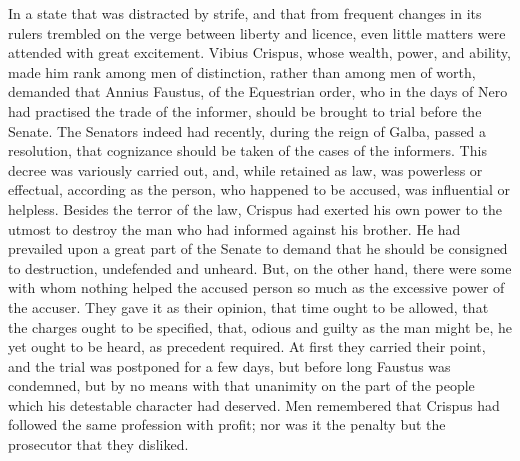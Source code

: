 In a state that was distracted by strife, and that from frequent changes in its rulers trembled on the verge between liberty and licence, even little matters were attended with great excitement. Vibius Crispus, whose wealth, power, and ability, made him rank among men of distinction, rather than among men of worth, demanded that Annius Faustus, of the Equestrian order, who in the days of Nero had practised the trade of the informer, should be brought to trial before the Senate. The Senators indeed had recently, during the reign of Galba, passed a resolution, that cognizance should be taken of the cases of the informers. This decree was variously carried out, and, while retained as law, was powerless or effectual, according as the person, who happened to be accused, was influential or helpless. Besides the terror of the law, Crispus had exerted his own power to the utmost to destroy the man who had informed against his brother. He had prevailed upon a great part of the Senate to demand that he should be consigned to destruction, undefended and unheard. But, on the other hand, there were some with whom nothing helped the accused person so much as the excessive power of the accuser. They gave it as their opinion, that time ought to be allowed, that the charges ought to be specified, that, odious and guilty as the man might be, he yet ought to be heard, as precedent required. At first they carried their point, and the trial was postponed for a few days, but before long Faustus was condemned, but by no means with that unanimity on the part of the people which his detestable character had deserved. Men remembered that Crispus had followed the same profession with profit; nor was it the penalty but the prosecutor that they disliked.


